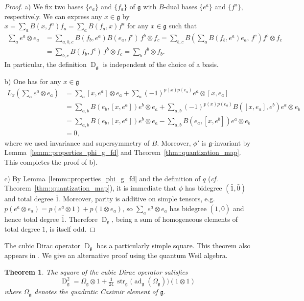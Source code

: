 \documentclass[11pt]{amsart}
\newcommand{\str}{\operatorname{str}}
\newcommand{\ad}{\operatorname{ad}}
\newcommand{\Dirac}{\operatorname{D}}
\def\gg{{\mathfrak{g}}}
\theoremstyle{plain}
\newtheorem{theorem}{Theorem}
\theoremstyle{remark}
\theoremstyle{definition}
\numberwithin{equation}{section}
\theoremstyle{remark}
\begin{document}
\begin{proof} 
a) We fix two bases $\{e_{a}\}$ and $\{f_{a}\}$ of $\gg$ with $B$-dual bases $\{e^{a}\}$ and $\{f^{a}\}$, respectively. We can express any $x \in \gg$ by $x=\sum_{a}B(x,f^{a})f_{a}=\sum_{a} B(f_{a},x)f^{a}$ for any $x \in \gg$ such that
\[
\begin{aligned}
\sum_{a} e^{a}\otimes e_{a}
 &=\sum_{a,b,c} B(f_{b},e^{a})B(e_{a},f^{c})\, f^{b}\otimes f_{c}
=\sum_{b,c} B\!\left(\sum_{a} B(f_{b},e^{a})e_{a},\, f^{c}\right) f^{b}\otimes f_{c}
 \\&=\sum_{b,c} B(f_{b},f^{c})\, f^{b}\otimes f_{c}
=\sum_{b} f^{b}\otimes f_{b}.
 \end{aligned}
\]
In particular, the definition $\Dirac_{\gg}$ is independent of the choice of a basis.

b) One has for any $x \in \gg$
\[
\begin{aligned}
L_{x}\left(\sum_{a}e^{a} \otimes e_{a}\right) &=\sum_{a}[x,e^{a}]\otimes e_{a} + \sum_{a}(-1)^{p(x)p(e_{a})}e^{a}\otimes [x,e_{a}] \\ &=\sum_{a,b}B(e_{b},[x,e^{a}])e^{b}\otimes e_{a} + \sum_{a,b} (-1)^{p(x)p(e_{a})}B([x,e_{a}],e^{b})e^{a}\otimes e_{b} \\ &=\sum_{a,b}B(e_{b},[x,e^{a}])e^{b}\otimes e_{a} - \sum_{a,b}B(e_{a},[x,e^{b}])e^{a}\otimes e_{b} \\ &=0,
\end{aligned}
\]
where we used invariance and supersymmetry of $B$. Moreover, $\phi'$ is $\gg$-invariant by Lemma~\ref{lemm::properties_phi_g_fd} and Theorem~\ref{thm::quantization_map}. This completes the proof of b).

c) By Lemma~\ref{lemm::properties_phi_g_fd} and the definition of $q$ (\emph{cf.} Theorem~\ref{thm::quantization_map}), it is immediate that $\phi$ has bidegree $(\bar{1},\bar{0})$ and total degree $\bar 1$. Moreover, parity is additive on simple tensors, e.g.
$p(e^{a}\otimes e_{a})=p(e^{a}\otimes 1)+p(1\otimes e_{a})$, so $\sum_{a}e^{a}\otimes e_{a}$ has bidegree $(\bar 1,\bar 0)$ and hence total degree $\bar 1$. Therefore $\Dirac_{\gg}$, being a sum of homogeneous elements of total degree $\bar 1$, is itself odd.
\end{proof}

The cubic Dirac operator $\Dirac_{\gg}$ has a particularly simple square. This theorem also appears in \cite{Meyer}. We give an alternative proof using the quantum Weil algebra.

\begin{theorem} \label{thm::square_absolute_Dirac}
The square of the cubic Dirac operator satisfies
\[
\Dirac_{\gg}^{2}
=
\Omega_{\gg}\otimes 1
+\tfrac{1}{24}\,\str_{\gg}\!\bigl(\ad_{\gg}(\Omega_{\gg})\bigr)(1\otimes 1)
\]
where $\Omega_{\gg}$ denotes the quadratic Casimir element of $\gg$.
\end{theorem}
\end{document}
